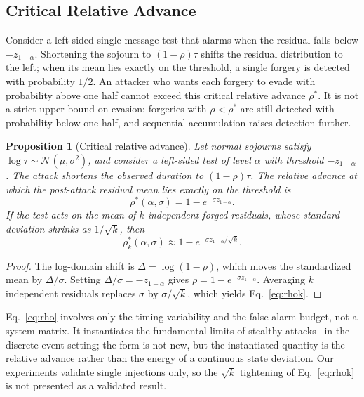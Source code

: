 \documentclass[manuscript,screen,review]{acmart}
\newtheorem{proposition}[theorem]{Proposition}%
\begin{document}
\subsection{Critical Relative Advance}
\label{sec:bound}

Consider a left-sided single-message test that alarms when the residual falls below $-z_{1-\alpha}$. Shortening the sojourn to $(1-\rho)\tau$ shifts the residual distribution to the left; when its mean lies exactly on the threshold, a single forgery is detected with probability $1/2$. An attacker who wants each forgery to evade with probability above one half cannot exceed this critical relative advance $\rho^*$. It is not a strict upper bound on evasion: forgeries with $\rho<\rho^*$ are still detected with probability below one half, and sequential accumulation raises detection further.

\begin{proposition}[Critical relative advance]
\label{prop:rho}
Let normal sojourns satisfy $\log\tau\sim\mathcal{N}(\mu,\sigma^2)$, and consider a left-sided test of level $\alpha$ with threshold $-z_{1-\alpha}$. The attack shortens the observed duration to $(1-\rho)\tau$. The relative advance at which the post-attack residual mean lies exactly on the threshold is
\begin{equation}
  \rho^*(\alpha,\sigma)=1-e^{-\sigma z_{1-\alpha}}.
  \label{eq:rho}
\end{equation}
If the test acts on the mean of $k$ independent forged residuals, whose standard deviation shrinks as $1/\sqrt{k}$, then
\begin{equation}
  \rho^*_k(\alpha,\sigma)\approx 1-e^{-\sigma z_{1-\alpha}/\sqrt{k}}.
  \label{eq:rhok}
\end{equation}
\end{proposition}

\begin{proof}
The log-domain shift is $\Delta=\log(1-\rho)$, which moves the standardized mean by $\Delta/\sigma$. Setting $\Delta/\sigma=-z_{1-\alpha}$ gives $\rho=1-e^{-\sigma z_{1-\alpha}}$. Averaging $k$ independent residuals replaces $\sigma$ by $\sigma/\sqrt{k}$, which yields Eq.~\eqref{eq:rhok}.
\end{proof}

Eq.~\eqref{eq:rho} involves only the timing variability and the false-alarm budget, not a system matrix. It instantiates the fundamental limits of stealthy attacks~\cite{liu2022limits} in the discrete-event setting; the form is not new, but the instantiated quantity is the relative advance rather than the energy of a continuous state deviation. Our experiments validate single injections only, so the $\sqrt{k}$ tightening of Eq.~\eqref{eq:rhok} is not presented as a validated result.
\end{document}
